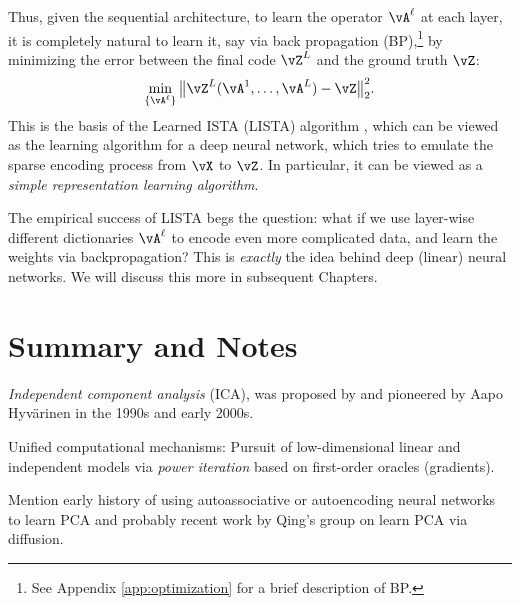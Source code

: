 \documentclass[\toplevelprefix/book-main.tex]{subfiles}
\begin{document}
Thus, given the sequential architecture, to learn the operator \(\vA^\ell\) at each layer, it is completely natural to learn it, say via back propagation (BP),\footnote{See Appendix \ref{app:optimization} for a brief description of BP.} by minimizing the error between the final code $\vZ^L$ and the ground truth $\vZ$:
\begin{equation}
    \min_{\{\vA^\ell\}} \big\|\vZ^L(\vA^1, \ldots, \vA^{L}) - \vZ\big\|_2^2.
\end{equation}
This is the basis of the Learned ISTA (LISTA) algorithm \cite{gregor2010learning}, which can be viewed as the learning algorithm for a deep  neural network, which tries to emulate the sparse encoding process from $\vX$ to $\vZ$. In particular, it can be viewed as a \textit{simple representation learning algorithm}. 


The empirical success of LISTA begs the question: what if we use layer-wise different  dictionaries \(\vA^\ell\) to encode even more complicated data, and learn the weights via backpropagation? This is \textit{exactly} the idea behind deep (linear) neural networks. We will discuss this more in subsequent Chapters.






\section{Summary and Notes}



\textit{Independent component analysis} (ICA), was proposed by \cite{Ans-1985} and pioneered by Aapo Hyv\"{a}rinen in the 1990s and early 2000s.

Unified computational mechanisms: Pursuit of low-dimensional linear and independent models via {\em power iteration} based on first-order oracles (gradients). 

Mention early history of using autoassociative or autoencoding neural networks to learn PCA and probably recent work by Qing's group on learn PCA via diffusion. 
\end{document}
